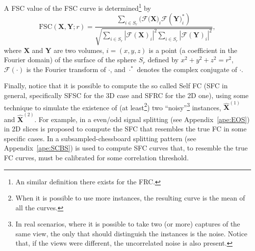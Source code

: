 \documentclass{article}
\begin{document}
A FSC value of the FSC curve is determined\footnote{An similar
  definition there exists for the FRC.} by~\cite{verbeke2024self}
\begin{equation}
\text{FSC}(\mathbf{X}, \mathbf{Y}; r) = \frac{\sum_{i \in S_r} (\mathcal{F}(\mathbf{X)}_i \mathcal{F}(\mathbf{Y)}_i^*)}{\sqrt{\sum_{i \in S_r} |\mathcal{F}(\mathbf{X})_i|^2 \sum_{i \in S_r} |\mathcal{F}(\mathbf{Y})_i|^2}},
\end{equation}
where $\mathbf{X}$ and $\mathbf{Y}$ are two volumes, $i=(x, y, z)$ is
a point (a coefficient in the Fourier domain) of the surface of the
sphere $S_r$ defined by $x^2+y^2+z^2=r^2$, $\mathcal{F}(\cdot)$ is the
Fourier transform of $\cdot$, and $\cdot^*$ denotes the complex
conjugate of $\cdot$.

Finally, notice that it is possible to compute the so called Self FC
(SFC in general, specifically SFSC for the 3D case and SFRC for the 2D
one), using some technique to simulate the existence of (at
least\footnote{When it is possible to use more instances, the
  resulting curve is the mean of all the curves.}) two
``noisy''\footnote{In real scenarios, where it is possible to take two
  (or more) captures of the same view, the only that should
  distinguish the instances is the noise. Notice that, if the views
  were different, the uncorrelated noise is also present.} instances,
$\hat{\mathbf{X}}^{(1)}$ and $\hat{\mathbf{X}}^{(2)}$. For example, in
\cite{verbeke2024self} a even/odd signal splitting (see
Appendix~\ref{ape:EOS}) in 2D slices is proposed to compute the SFC
that resembles the true FC in some specific cases. In
\cite{koho2019fourier} a subsampled-chessboard splitting pattern (see
Appendix~\ref{ape:SCBS}) is used to compute SFC curves that, to
resemble the true FC curves, must be calibrated for some correlation
threshold.
\end{document}

